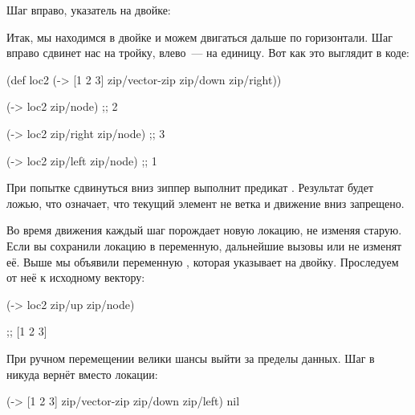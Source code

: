 \begin{figure}[H]
  \centering
  
  \label{fig:chart-zip-02}
\end{figure}

\pagebreaklarge

Шаг вправо, указатель на двойке:

\begin{figure}[H]
  \centering
  
  \label{fig:chart-zip-03}
\end{figure}

Итак, мы находимся в двойке и можем двигаться дальше по горизонтали. Шаг вправо
сдвинет нас на тройку, влево~--- на единицу. Вот как это выглядит в коде:

\begin{english}
  \begin{clojure}
(def loc2
  (-> [1 2 3]
      zip/vector-zip
      zip/down
      zip/right))

(-> loc2 zip/node)           ;; 2

(-> loc2 zip/right zip/node) ;; 3

(-> loc2 zip/left zip/node)  ;; 1
  \end{clojure}
\end{english}

При попытке сдвинуться вниз зиппер выполнит предикат . Результат
будет ложью, что означает, что текущий элемент не ветка и движение вниз
запрещено.

Во время движения каждый шаг порождает новую локацию, не изменяя старую. Если вы
сохранили локацию в переменную, дальнейшие вызовы  или
 не изменят её. Выше мы объявили переменную , которая
указывает на двойку. Проследуем от неё к исходному вектору:

\begin{english}
  \begin{clojure}
(-> loc2 zip/up zip/node)

;; [1 2 3]
  \end{clojure}
\end{english}

\pagebreaklarge

При ручном перемещении велики шансы выйти за пределы данных. Шаг в никуда вернёт
 вместо локации:

\begin{english}
  \begin{clojure}
(-> [1 2 3]
    zip/vector-zip
    zip/down
    zip/left)
nil
  \end{clojure}
\end{english}

